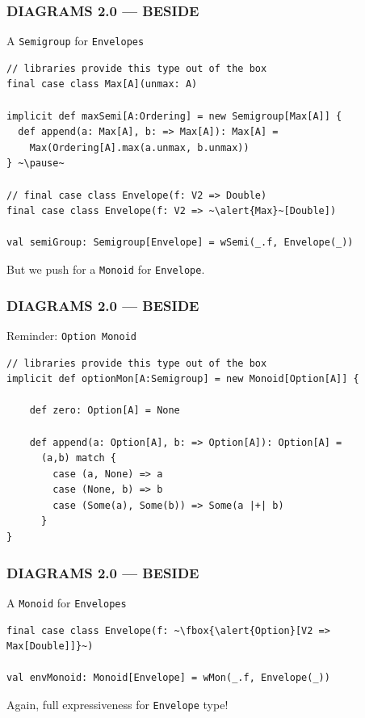 \documentclass{beamer}
\begin{document}
\begin{frame}[fragile] \frametitle{DIAGRAMS 2.0 --- BESIDE}
  \begin{block}{A \texttt{Semigroup} for \texttt{Envelopes}}
  \begin{lstlisting}
// libraries provide this type out of the box
final case class Max[A](unmax: A)

implicit def maxSemi[A:Ordering] = new Semigroup[Max[A]] {
  def append(a: Max[A], b: => Max[A]): Max[A] =
    Max(Ordering[A].max(a.unmax, b.unmax))
} ~\pause~

// final case class Envelope(f: V2 => Double)
final case class Envelope(f: V2 => ~\alert{Max}~[Double])

val semiGroup: Semigroup[Envelope] = wSemi(_.f, Envelope(_))
  \end{lstlisting}
  \end{block}

  But we push for a \texttt{Monoid} for \texttt{Envelope}.
\end{frame}

\begin{frame}[fragile] \frametitle{DIAGRAMS 2.0 --- BESIDE}
  \begin{block}{Reminder: \texttt{Option Monoid}}
  \begin{lstlisting}
// libraries provide this type out of the box
implicit def optionMon[A:Semigroup] = new Monoid[Option[A]] {

    def zero: Option[A] = None

    def append(a: Option[A], b: => Option[A]): Option[A] =
      (a,b) match {
        case (a, None) => a
        case (None, b) => b
        case (Some(a), Some(b)) => Some(a |+| b)
      }
}
  \end{lstlisting}
  \end{block}
\end{frame}

\begin{frame}[fragile] \frametitle{DIAGRAMS 2.0 --- BESIDE}
  \begin{block}{A \texttt{Monoid} for \texttt{Envelopes}}
  \begin{lstlisting}
final case class Envelope(f: ~\fbox{\alert{Option}[V2 => Max[Double]]}~)

val envMonoid: Monoid[Envelope] = wMon(_.f, Envelope(_))
  \end{lstlisting}
  \end{block}

Again, full expressiveness for \texttt{Envelope} type!
\end{frame}
\end{document}
